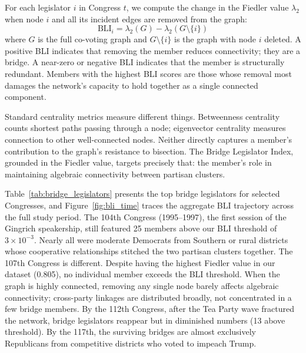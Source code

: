\documentclass[12pt, a4paper]{article}
\begin{document}
For each legislator $i$ in Congress $t$, we compute the change in the Fiedler value $\lambda_2$ when node $i$ and all its incident edges are removed from the graph:
\begin{equation}
    \text{BLI}_i = \lambda_2(G) - \lambda_2(G \setminus \{i\})
\end{equation}
where $G$ is the full co-voting graph and $G \setminus \{i\}$ is the graph with node $i$ deleted. A positive BLI indicates that removing the member reduces connectivity; they are a bridge. A near-zero or negative BLI indicates that the member is structurally redundant. Members with the highest BLI scores are those whose removal most damages the network's capacity to hold together as a single connected component.

Standard centrality metrics measure different things. Betweenness centrality counts shortest paths passing through a node; eigenvector centrality measures connection to other well-connected nodes. Neither directly captures a member's contribution to the graph's resistance to bisection. The Bridge Legislator Index, grounded in the Fiedler value, targets precisely that: the member's role in maintaining algebraic connectivity between partisan clusters.

Table~\ref{tab:bridge_legislators} presents the top bridge legislators for selected Congresses, and Figure~\ref{fig:bli_time} traces the aggregate BLI trajectory across the full study period. The 104th Congress (1995--1997), the first session of the Gingrich speakership, still featured 25 members above our BLI threshold of $3 \times 10^{-3}$. Nearly all were moderate Democrats from Southern or rural districts whose cooperative relationships stitched the two partisan clusters together. The 107th Congress is different. Despite having the highest Fiedler value in our dataset (0.805), no individual member exceeds the BLI threshold. When the graph is highly connected, removing any single node barely affects algebraic connectivity; cross-party linkages are distributed broadly, not concentrated in a few bridge members. By the 112th Congress, after the Tea Party wave fractured the network, bridge legislators reappear but in diminished numbers (13 above threshold). By the 117th, the surviving bridges are almost exclusively Republicans from competitive districts who voted to impeach Trump.
\end{document}
